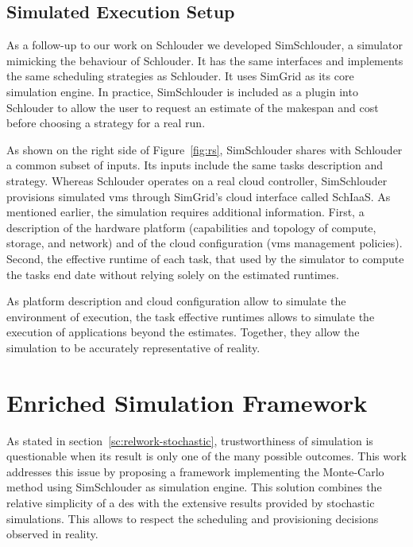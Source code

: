 \documentclass[]{llncs}
\begin{document}
\subsection{Simulated Execution Setup}
As a follow-up  to our work on Schlouder we  developed SimSchlouder, a simulator
mimicking  the  behaviour  of  Schlouder. It has the same interfaces and implements  the  same  scheduling
strategies  as  Schlouder. It  uses  SimGrid  as its  core  simulation  engine.  In
practice, SimSchlouder  is included as  a plugin  into Schlouder to allow the
user to request an estimate of the makespan and cost before choosing a
strategy for a real run.

As  shown on  the right  side of  Figure~\ref{fig:rs}, SimSchlouder  shares with
Schlouder  a common  subset of  inputs.   Its inputs  include the  same tasks
description  and  strategy.    Whereas  Schlouder  operates  on   a  real  cloud
controller,  SimSchlouder   provisions  simulated  \acp{vm} through
SimGrid's cloud interface  called SchIaaS. As mentioned  earlier, the simulation
requires  additional information. First, a description of the hardware platform 
(capabilities and topology of compute, storage, and network) and of the cloud configuration
(\acp{vm} management policies). Second, the effective runtime of each task, that
used by the simulator to compute the tasks end date without relying solely on the
estimated runtimes. 

As platform description and cloud configuration allow to simulate the environment of 
execution, the task effective runtimes allows to simulate the execution of 
applications beyond the estimates. Together, they allow the simulation to be 
accurately representative of reality.

\section{Enriched Simulation Framework}\label{sec:enriched-sim}


As stated in  section~\ref{sc:relwork-stochastic}, trustworthiness of simulation
is questionable when its result is only one of the many possible outcomes. This
work addresses this issue by  proposing a framework implementing the Monte-Carlo
method using SimSchlouder  as  simulation engine.   This  solution combines  the
relative  simplicity  of a  \ac{des}  with  the  extensive results  provided  by
stochastic simulations.   This allows to respect the scheduling and provisioning 
decisions observed in reality. 
\end{document}
